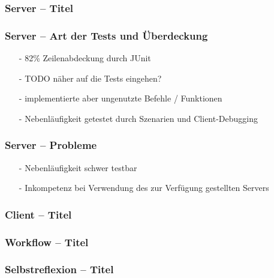 \documentclass[aspectratio=1610]{beamer}
\begin{document}
	\begin{frame}[plain]
        \frametitle{\textbf{Server} -- Titel}
  \end{frame}

  \begin{frame}[plain]
        \frametitle{\textbf{Server} -- Art der Tests und Überdeckung}
        \begin{itemize}
            \item[-] 82\% Zeilenabdeckung durch JUnit
            \item[-] TODO näher auf die Tests eingehen?
            \item[-] implementierte aber ungenutzte Befehle / Funktionen
            \item[-] Nebenläufigkeit getestet durch Szenarien
                  und Client-Debugging
        \end{itemize}
  \end{frame}

  \begin{frame}[plain]
        \frametitle{\textbf{Server} -- Probleme}

        \begin{itemize}
          \item[-] Nebenläufigkeit schwer testbar
          \item[-] Inkompetenz bei Verwendung des zur Verfügung
                   gestellten Servers
        \end{itemize}
  \end{frame}


	\begin{frame}[plain]
        \frametitle{\textbf{Client} -- Titel}
    \end{frame}


	\begin{frame}[plain]
        \frametitle{\textbf{Workflow} -- Titel}
    \end{frame}


	\begin{frame}[plain]
        \frametitle{\textbf{Selbstreflexion} -- Titel}
    \end{frame}
\end{document}
